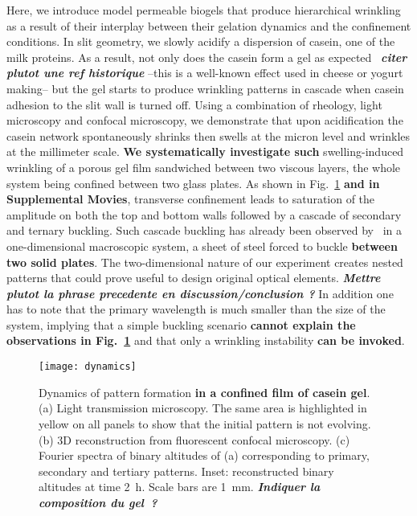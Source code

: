 \documentclass[twocolumn,superscriptaddress,showpacs,preprintnumbers,
amsmath,amssymb,prl]{revtex4-1}
\newcommand{\seb}[1]{\textbf{\color{blue}#1}} %
\begin{document}
Here, we introduce model permeable biogels that produce hierarchical wrinkling as a result of their interplay between their gelation dynamics and the confinement conditions. In slit geometry, we slowly acidify a dispersion of casein, one of the milk proteins.  As a result, not only does the casein form a gel as expected~\cite{Leocmach2014} \seb{\it citer plutot une ref historique} --this is a well-known effect used in cheese or yogurt making-- but the gel starts to produce wrinkling patterns in cascade when casein adhesion to the slit wall is turned off. Using a combination of rheology, light microscopy and confocal microscopy, we demonstrate that upon acidification the casein network spontaneously shrinks then swells at the micron level and wrinkles at the millimeter scale. \seb{We systematically investigate such} swelling-induced wrinkling of a porous gel film sandwiched between two viscous layers, the whole system being confined between two glass plates. As shown in Fig.~\ref{fig:dynamics} \seb{and in Supplemental Movies}, transverse confinement leads to saturation of the amplitude on both the top and bottom walls followed by a cascade of secondary and ternary buckling. Such cascade buckling has already been observed by~\cite{Roman1999} in a one-dimensional macroscopic system, a sheet of steel forced to buckle \seb{between two solid plates}. The two-dimensional nature of our experiment creates nested patterns that could prove useful to design original optical elements. \seb{\it Mettre plutot la phrase precedente en discussion/conclusion ?} In addition one has to note that the primary wavelength is much smaller than the size of the system, implying that a simple buckling scenario \seb{cannot explain the observations in Fig.~\ref{fig:dynamics}} and that only a wrinkling instability \seb{can be invoked}. 

\begin{figure}[ht!]
	\texttt{[image: dynamics]}
	\caption{Dynamics of pattern formation \seb{in a confined film of casein gel}. (a) Light transmission microscopy. The same area is highlighted in yellow on all panels to show that the initial pattern is not evolving. (b) 3D reconstruction from fluorescent confocal microscopy. (c) Fourier spectra of binary altitudes of (a) corresponding to primary, secondary and tertiary patterns. Inset: reconstructed binary altitudes at time \SI{2}{\hour}. Scale bars are \SI{1}{\milli\metre}. \seb{\it Indiquer la composition du gel~?}}
	\label{fig:dynamics}
\end{figure}
\end{document}
